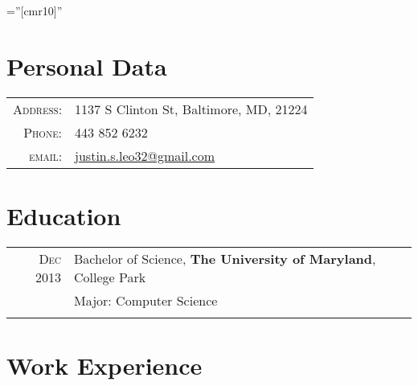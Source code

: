 \documentclass[a4paper,10pt]{article} %
\begin{document}
\pagestyle{empty} %

\font\fb=''[cmr10]'' %


\par{\bigskip\par} %

\section{Personal Data}

\begin{tabular}{rl}
\textsc{Address:} & 1137 S Clinton St, Baltimore, MD, 21224 \\
\textsc{Phone:} & 443 852 6232\\
\textsc{email:} & \href{mailto:justin.s.leo32@gmail.com}{justin.s.leo32@gmail.com}
\end{tabular}


\section{Education}

\begin{tabular}{rl}
\textsc{Dec} 2013 & Bachelor of Science, \textbf{The University of Maryland}, College Park\\
& Major: Computer Science\\
&\\

\end{tabular}


\section{Work Experience}
\end{document}
